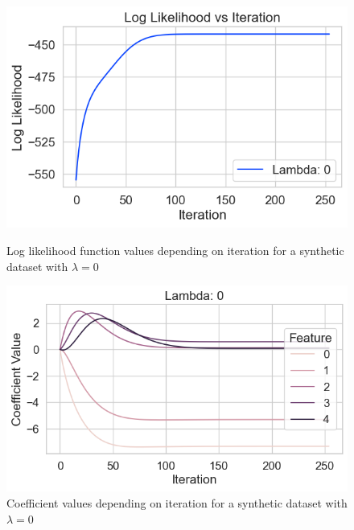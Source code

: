 \documentclass[11pt]{article}
\begin{document}
\begin{figure}[h]
    \centering
    \begin{minipage}{0.48\textwidth}
        \centering
        \includegraphics[width=\textwidth]{../results/log_likelihood_synthetic_dataset_lambda_0.png}
        \caption{Log likelihood function values depending on iteration for a synthetic dataset with $\lambda=0$}
        \label{fig:log-likelihood-synthetic-dataset-lambda-0}
    \end{minipage}
    \hfill
    \begin{minipage}{0.48\textwidth}
        \centering
        \includegraphics[width=\textwidth]{../results/coefficients_synthetic_dataset_lambda_0.png}
        \caption{Coefficient values depending on iteration for a synthetic dataset with $\lambda=0$}
        \label{fig:coefficients-synthetic-dataset-lambda-0}
    \end{minipage}
\end{figure}
\end{document}
